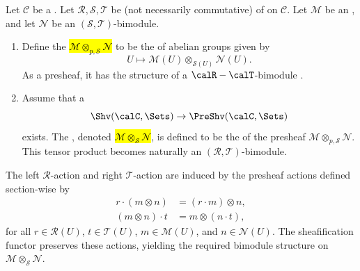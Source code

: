 \begin{definition} \label{definition:tensor_product_of_sheaves_of_bimodules_over_sheaves_of_rings_on_a_site}
Let $\mathcal{C}$ be a . Let $\mathcal{R}, \mathcal{S}, \mathcal{T}$ be (not necessarily commutative)  of  on $\mathcal{C}$. Let $\mathcal{M}$ be an , and let $\mathcal{N}$ be an $(\mathcal{S}, \mathcal{T})$-bimodule.


\begin{enumerate}
    \item Define the 
    \hl{$\mathcal{M} \otimes_{p,\mathcal{S}} \mathcal{N}$} to be the  of abelian groups given by
    $$ U \longmapsto \mathcal{M}(U) \otimes_{\mathcal{S}(U)} \mathcal{N}(U).$$
     As a presheaf, it has the structure of a $\calR-\calT$-bimodule .

    \item Assume that a  
    $$\Shv(\calC, \Sets) \to \PreShv(\calC, \Sets)$$
    exists.  The , denoted \hl{$\mathcal{M} \otimes_{\mathcal{S}} \mathcal{N}$}, is defined to be the  of the presheaf $\mathcal{M} \otimes_{p,\mathcal{S}} \mathcal{N}$. This tensor product becomes naturally an $(\mathcal{R}, \mathcal{T})$-bimodule.

\end{enumerate}

The left $\mathcal{R}$-action and right $\mathcal{T}$-action are induced by the presheaf actions defined section-wise by
\begin{align*}
r \cdot (m \otimes n) &= (r \cdot m) \otimes n, \\
(m \otimes n) \cdot t &= m \otimes (n \cdot t),
\end{align*}
for all $r \in \mathcal{R}(U)$, $t \in \mathcal{T}(U)$, $m \in \mathcal{M}(U)$, and $n \in \mathcal{N}(U)$. The sheafification functor preserves these actions, yielding the required bimodule structure on $\mathcal{M} \otimes_{\mathcal{S}} \mathcal{N}$.



\end{definition}
